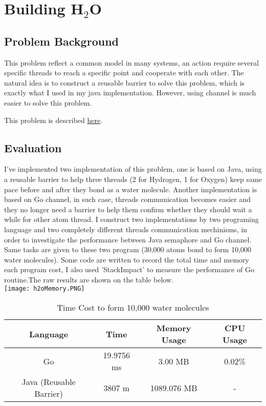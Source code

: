 \documentclass[a4paper,10pt]{article}
\begin{document}
\newpage
\section{Building H$_2$O}
\subsection{Problem Background}
This problem reflect a common model in many systems, an action require several specific threads to reach a specific point and  cooperate with each other. The natural idea is to construct a reusable barrier to solve this problem, which is exactly what I used in my java implementation. However, using channel is much easier to solve this problem.

This problem is described \href{http://greenteapress.com/semaphores/LittleBookOfSemaphores.pdf#section.5.6}{here}.
\subsection{Evaluation}
I've implemented two implementation of this problem, one is based on Java, using a reusable barrier to help three threads (2 for Hydrogen, 1 for Oxygen) keep same pace before and after they bond as a water molecule. Another implementation is based on Go channel, in such case, threads communication becomes easier and they no longer need a barrier to help them confirm whether they should wait a while for other atom thread. I construct two implementations by two programing language and two completely different threads communication mechinisms, in order to investigate the performance between Java semaphore and Go channel.
Same tasks are given to these two program (30,000 atoms bond to form 10,000 water molecules). Some code are written to record the total time and memory each program cost, I also used 'StackImpact' to measure the performance of Go routine.The raw results are shown on the table below.\\

\texttt{[image: h2oMemory.PNG]}\\

\begin{table}[h]
    \centering
    \begin{tabular}{|c|c|c|c|}
    \hline
        \textbf{Language} & \textbf{Time}& \textbf{Memory Usage}& \textbf{CPU Usage}\\\hline
        Go & 19.9756 ms& 3.00 MB & 0.02\% \\\hline
        Java (Reusable Barrier) & 3807 m & 1089.076 MB& -\\\hline
        
    \end{tabular}
    \caption{Time Cost to form 10,000 water molecules}
\end{table}
\end{document}
